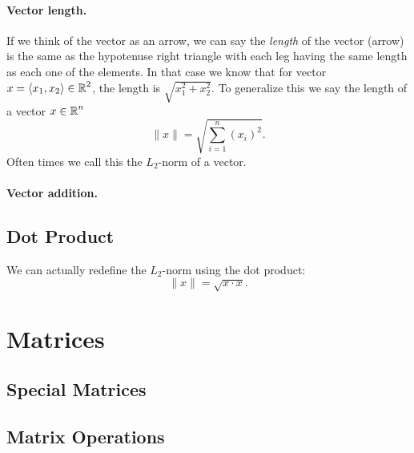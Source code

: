 \documentclass[11pt, oneside]{article}   	%
\begin{document}
\paragraph{Vector length.}
If we think of the vector as an arrow, we can say the \emph{length} of the vector (arrow) is the same as the hypotenuse 
right triangle with each leg having the same length as each one of the elements. 
In that case we know that for vector $x = \left\langle x_1,x_2\right\rangle\in\operatorname{\mathbb{R}}^2$, the length is $\sqrt{x_1^2 + x_2^2}$.
To generalize this we say the length of a vector $x\in\operatorname{\mathbb{R}}^n$
\[
\|x\| = \sqrt{\sum_{i=1}^n \left(x_i\right)^2}.
\]
Often times we call this the $L_2$-norm of a vector. 

\paragraph{Vector addition.}


\subsection{Dot Product}

We can actually redefine the $L_2$-norm using the dot product:
\[
\|x\| = \sqrt{x \cdot x}.
\]
\section{Matrices}

\subsection{Special Matrices}

\subsection{Matrix Operations}
\end{document}
